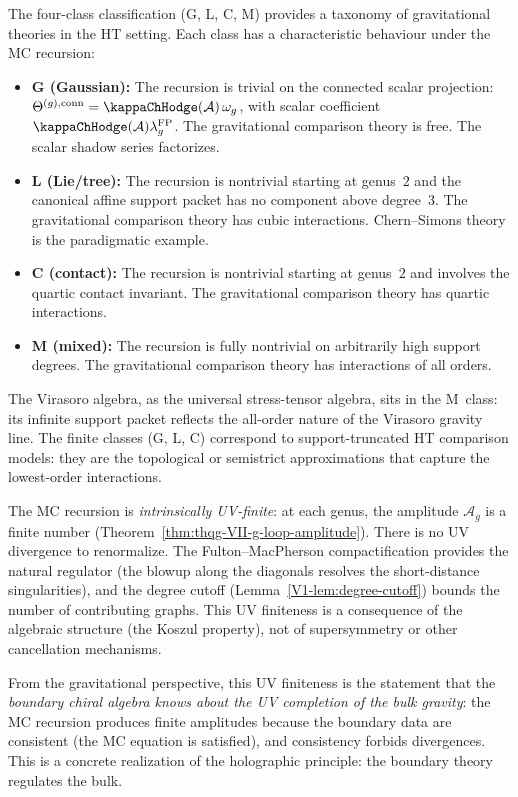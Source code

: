 \begin{remark}
The four-class classification (G, L, C, M) provides a taxonomy
of gravitational theories in the HT setting. Each class has a
characteristic behaviour under the MC recursion:
\begin{itemize}
\item \textbf{G (Gaussian):} The recursion is trivial
 on the connected scalar projection:
 $\Theta^{(g),\mathrm{conn}}
 = \kappaChHodge(\cA)\,\omega_g$, with scalar
 coefficient
 $\kappaChHodge(\cA)\lambda_g^{\mathrm{FP}}$. The gravitational
comparison theory is free. The scalar shadow series factorizes.
\item \textbf{L (Lie/tree):} The recursion is nontrivial
 starting at genus~$2$ and the canonical affine support packet has no
 component above degree~$3$. The gravitational comparison theory has
 cubic interactions. Chern--Simons
 theory is the paradigmatic example.
\item \textbf{C (contact):} The recursion is nontrivial
 starting at genus~$2$ and involves the quartic contact
 invariant. The gravitational comparison theory has quartic
 interactions.
\item \textbf{M (mixed):} The recursion is fully nontrivial
 on arbitrarily high support degrees. The gravitational comparison
 theory has interactions of all orders.
\end{itemize}
The Virasoro algebra, as the universal stress-tensor algebra,
sits in the M~class: its infinite support packet reflects the
all-order nature of the Virasoro gravity line. The finite classes
(G, L, C) correspond to support-truncated HT comparison models: they
are the topological or semistrict approximations that capture the
lowest-order
interactions.
\end{remark}

\begin{remark}
The MC recursion is \emph{intrinsically UV-finite}: at each
genus, the amplitude $\mathcal{A}_g$ is a finite number
(Theorem~\ref{thm:thqg-VII-g-loop-amplitude}). There is no
UV divergence to renormalize. The Fulton--MacPherson
compactification provides the natural regulator (the
blowup along the diagonals resolves the short-distance
singularities), and the degree cutoff
(Lemma~\ref{V1-lem:degree-cutoff}) bounds the number of
contributing graphs. This UV finiteness is a consequence
of the algebraic structure (the Koszul property), not of
supersymmetry or other cancellation mechanisms.

From the gravitational perspective, this UV finiteness is the
statement that the \emph{boundary chiral algebra knows about
the UV completion of the bulk gravity}: the MC recursion
produces finite amplitudes because the boundary data are
consistent (the MC equation is satisfied), and consistency
forbids divergences. This is a concrete realization of the
holographic principle: the boundary theory regulates the bulk.
\end{remark}

